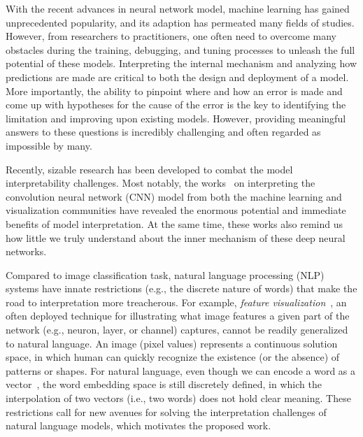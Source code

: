 \maketitle

With the recent advances in neural network model, machine learning has gained unprecedented popularity, and its adaption has permeated many fields of studies.
%
However, from researchers to practitioners, one often need to overcome many obstacles during the training, debugging, and tuning processes to unleash the full potential of these models.
%
Interpreting the internal mechanism and analyzing how predictions are made are critical to both the design and deployment of a model.
More importantly, the ability to pinpoint where and how an error is made and come up with hypotheses for the cause of the error is the key to identifying the limitation and improving upon existing models.
However, providing meaningful answers to these questions is incredibly challenging and often regarded as impossible by many.

Recently, sizable research has been developed to combat the model interpretability challenges. Most notably, the works~\cite{SimonyanVedaldiZisserman2013, ZeilerFergus2014, YosinskiCluneNguyen2015, OlahMordvintsevSchubert2017, LiuShiLi2017, OlahSatyanarayanJohnson2018, BilalJourablooYe2018} on interpreting the convolution neural network (CNN) model from both the machine learning and visualization communities have revealed the enormous potential and immediate benefits of model interpretation. At the same time, these works also remind us how little we truly understand about the inner mechanism of these deep neural networks.

Compared to image classification task, natural language processing (NLP) systems have innate restrictions (e.g., the discrete nature of words) that make the road to interpretation more treacherous. For example, \emph{feature visualization}~\cite{OlahMordvintsevSchubert2017}, an often deployed technique for illustrating what image features a given part of the network (e.g., neuron, layer, or channel) captures, cannot be readily generalized to natural language. An image (pixel values) represents a continuous solution space, in which human can quickly recognize the existence (or the absence) of patterns or shapes. For natural language, even though we can encode a word as a vector~\cite{MikolovSutskeverChen2013, PenningtonSocherManning2014}, the word embedding space is still discretely defined, in which the interpolation of two vectors (i.e., two words) does not hold clear meaning.
%
These restrictions call for new avenues for solving the interpretation challenges of natural language models, which motivates the proposed work.

